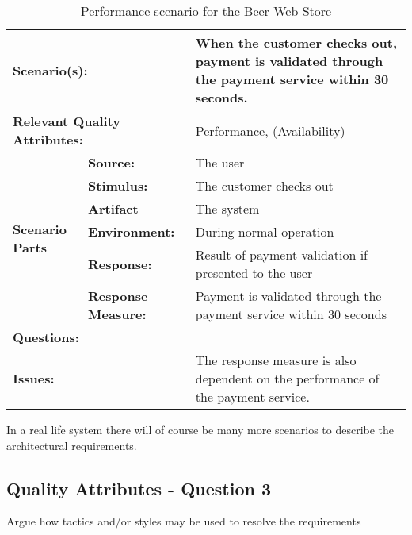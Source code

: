 \begin{table}[H]
\begin{center}
\begin{tabular}{|p{0.3cm}|p{2.5cm}|p{8cm}|}
  \hline
  \multicolumn{2}{|p{3cm}|}{\bfseries Scenario(s):} & When the customer checks out, payment is validated through the payment service within 30 seconds. \\
  \hline
  \multicolumn{2}{|p{3cm}|}{\bfseries Relevant Quality Attributes:} & Performance, (Availability) \\
  \hline
  \multirow{6}{*}{\begin{sideways}{\bfseries Scenario Parts}\end{sideways}}
  & {\bfseries Source:} & The user \\
  \cline{2-3}
  & {\bfseries Stimulus:} & The customer checks out \\
  \cline{2-3}
  & {\bfseries Artifact} & The system \\
  \cline{2-3}
  & {\bfseries Environment:} & During normal operation \\
  \cline{2-3}
  & {\bfseries Response:} & Result of payment validation if presented to the user \\
  \cline{2-3}
  & {\bfseries Response Measure:} & Payment is validated through the payment service within 30 seconds \\
  \hline
  \multicolumn{2}{|p{3cm}|}{\bfseries Questions:} & \\
  \hline
  \multicolumn{2}{|p{3cm}|}{\bfseries Issues:} & The response measure is also dependent on the performance of the payment service. \\
  \hline
\end{tabular}
\caption{Performance scenario for the Beer Web Store}
\label{tab:performance}
\end{center}
\end{table}

In a real life system there will of course be many more scenarios to describe the architectural requirements.

\subsection{Quality Attributes - Question 3}
\label{sec:qa_q3}

\begin{question}
Argue how tactics and/or styles may be used to resolve the requirements
\end{question}

